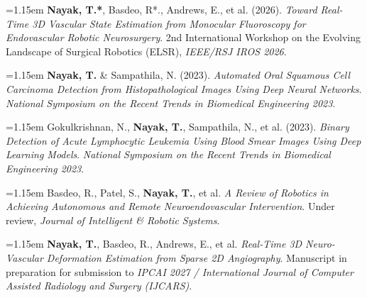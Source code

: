 \documentclass[letterpaper,10pt]{article}
\newlength{\pubgap}
\newcommand{\cvPub}[1]{%
  \needspace{2\baselineskip}%
  \begingroup\normalsize\hangindent=1.15em\hangafter=1\noindent #1\par\endgroup
  \vspace{\pubgap}%
}
\newcommand{\pubLabel}[1]{%
  \vspace{1pt}{\small\bfseries #1}\par\vspace{1pt}%
}
\begin{document}
\cvPub{
\textbf{Nayak, T.*}, Basdeo, R*., Andrews, E.,
et al. (2026).
\textit{Toward Real-Time 3D Vascular State Estimation
from Monocular Fluoroscopy for Endovascular
Robotic Neurosurgery}.
2nd International Workshop on the Evolving Landscape
of Surgical Robotics (ELSR),
\textit{IEEE/RSJ IROS 2026}.
}

\cvPub{
\textbf{Nayak, T.} \& Sampathila, N. (2023).
\textit{Automated Oral Squamous Cell Carcinoma Detection
from Histopathological Images Using Deep Neural Networks}.
\textit{National Symposium on the Recent Trends in Biomedical Engineering 2023}.
}

\cvPub{
Gokulkrishnan, N., \textbf{Nayak, T.},
Sampathila, N., et al. (2023).
\textit{Binary Detection of Acute Lymphocytic Leukemia
Using Blood Smear Images Using Deep Learning Models}.
\textit{National Symposium on the Recent Trends in Biomedical Engineering 2023}.
}


\pubLabel{Under Review \& Manuscripts in Preparation}

\cvPub{
Basdeo, R., Patel, S., \textbf{Nayak, T.}, et al.
\textit{A Review of Robotics in Achieving Autonomous
and Remote Neuroendovascular Intervention}.
Under review, \textit{Journal of Intelligent
\& Robotic Systems}.
}

\cvPub{
\textbf{Nayak, T.}, Basdeo, R., Andrews, E., et al.
\textit{Real-Time 3D Neuro-Vascular Deformation
Estimation from Sparse 2D Angiography}.
Manuscript in preparation for submission to
\textit{IPCAI 2027 / International Journal of Computer
Assisted Radiology and Surgery (IJCARS)}.
}


\end{document}
